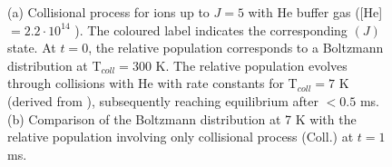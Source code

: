 \begin{figure}[!htb]
    \hfill
    \caption{(a) Collisional process for \CD ions up to $J=5$ with He buffer gas ([He]$=2.2 \cdot 10^{14}$ \percc). The 
    coloured label indicates the corresponding \CD$(J)$ state. At $t=0$, the relative population
    corresponds to a Boltzmann distribution at T$_{coll}=300$ K. The relative population evolves through collisions 
    with He with rate constants for T$_{coll}=7$ K (derived from \cite{Werfelli2017}), subsequently reaching 
    equilibrium after $<0.5$ ms. (b) Comparison of the Boltzmann distribution at 7 K with the relative population 
    involving only collisional process (Coll.) at $t=1$ ms.}
    \label{fig:ROSAA-sim-collisional-boltzman-comparision}
\end{figure}